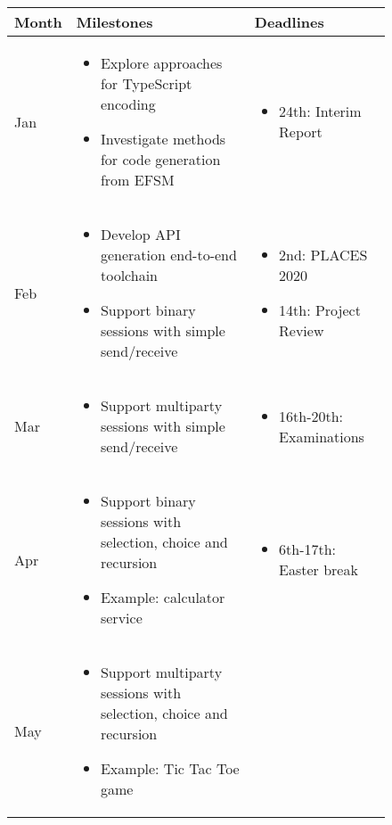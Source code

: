 \begin{figure}
\centering
\begin{tabular}{l|p{}|p{}}
Month & Milestones & Deadlines \\
\hline\hline
Jan & \begin{itemize}
\item Explore approaches for TypeScript encoding
\item Investigate methods for code generation from EFSM
\end{itemize} & \begin{itemize}
\item 24th: Interim Report
\end{itemize} \\
\hline
Feb & \begin{itemize}
\item Develop API generation end-to-end toolchain
\item Support binary sessions with simple send/receive
\end{itemize} & \begin{itemize}
\item 2nd: PLACES 2020
\item 14th: Project Review
\end{itemize} \\
\hline
Mar & \begin{itemize}
\item Support multiparty sessions with simple send/receive
\end{itemize} & \begin{itemize}
\item 16th-20th: Examinations
\end{itemize}\\
\hline
Apr & \begin{itemize}
\item Support binary sessions with selection, choice and recursion
\item Example: calculator service
\end{itemize} & \begin{itemize}
\item 6th-17th: Easter break
\end{itemize}\\
\hline
May & \begin{itemize}
\item Support multiparty sessions with selection, choice and recursion
\item Example: Tic Tac Toe game
\end{itemize} & \begin{itemize}

\end{itemize}
\end{tabular}
\end{figure}
